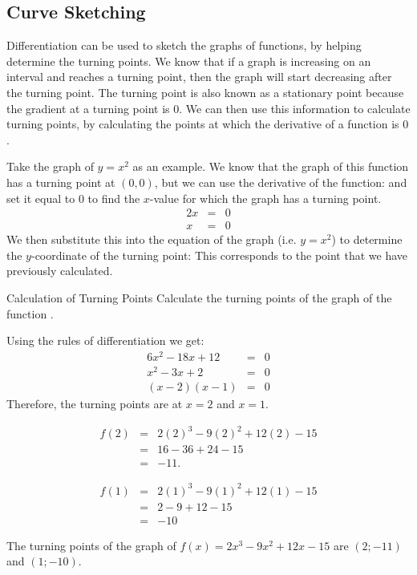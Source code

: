 \subsection{Curve Sketching}
\label{md:graphs:curve}
Differentiation can be used to sketch the graphs of functions, by helping determine the turning points. We know that if a graph is increasing on an interval and reaches a turning point, then the graph will start decreasing after the turning point. The turning point is also known as a stationary point because the gradient at a turning point is $0$. We can then use this information to calculate turning points, by calculating the points at which the derivative of a function is $0$.


Take the graph of $y=x^2$ as an example. We know that the graph of this function has a turning point at $(0,0)$, but we can use the derivative of the function:
and set it equal to $0$ to find the $x$-value for which the graph has a turning point.
\begin{eqnarray*}
2x&=&0\\
x&=&0
\end{eqnarray*}
We then substitute this into the equation of the graph (i.e. $y=x^2$) to determine the $y$-coordinate of the turning point:
This corresponds to the point that we have previously calculated.

\begin{wex}{Calculation of Turning Points}
{Calculate the turning points of the graph of the function .}
{
Using the rules of differentiation we get:
\begin{eqnarray*}
6x^2-18x+12&=&0\\
x^2-3x+2&=&0\\
(x-2)(x-1)&=&0
\end{eqnarray*}
Therefore, the turning points are at $x=2$ and $x=1$.

\begin{eqnarray*}
f(2)&=&2(2)^3-9(2)^2+12(2)-15\\
&=&16-36+24-15\\
&=&-11.
\end{eqnarray*}

\begin{eqnarray*}
f(1)&=&2(1)^3-9(1)^2+12(1)-15\\
&=&2-9+12-15\\
&=&-10
\end{eqnarray*}

The turning points of the graph of $f(x)=2x^3 - 9x^2 + 12x - 15$ are $(2;-11)$ and $(1;-10)$.}
\end{wex}

